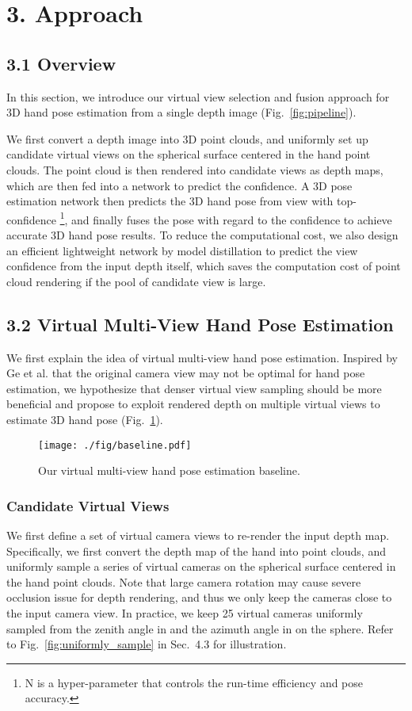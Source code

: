 \documentclass[letterpaper]{article} \usepackage{aaai22}  \usepackage{times}  \usepackage{helvet}  \usepackage{courier}  \usepackage[hyphens]{url}  \usepackage{graphicx} \urlstyle{rm} \def\UrlFont{\rm}  \usepackage{natbib}  \usepackage{caption} \DeclareCaptionStyle{ruled}{labelfont=normalfont,labelsep=colon,strut=off} \frenchspacing  \setlength{\pdfpagewidth}{8.5in}  \setlength{\pdfpageheight}{11in}  \usepackage{algorithm}
\begin{document}
\section{3. Approach}

\subsection{3.1 Overview}
In this section, we introduce our virtual view selection and fusion approach for 3D hand pose estimation from a single depth image (Fig.~\ref{fig:pipeline}). 

We first convert a depth image into 3D point clouds, and uniformly set up candidate virtual views on the spherical surface centered in the hand point clouds.
The point cloud is then rendered into candidate views as depth maps, which are then fed into a network to predict the confidence.
A 3D pose estimation network then predicts the 3D hand pose from view with top- confidence \footnote{N is a hyper-parameter that controls the run-time efficiency and pose accuracy.}, and finally fuses the pose with regard to the confidence to achieve accurate 3D hand pose results. 
To reduce the computational cost, we also design an efficient lightweight network by model distillation to predict the view confidence from the input depth itself, which saves the computation cost of point cloud rendering if the pool of candidate view is large.

\subsection{3.2 Virtual Multi-View Hand Pose Estimation}
We first explain the idea of virtual multi-view hand pose estimation.
Inspired by Ge et al. \cite{ge2016robust} that the original camera view may not be optimal for hand pose estimation, we hypothesize that denser virtual view sampling should be more beneficial and propose to exploit rendered depth on multiple virtual views to estimate 3D hand pose (Fig.~\ref{fig:baseline}).

\begin{figure}[h]
\centering 
\texttt{[image: ./fig/baseline.pdf]}
\caption{Our virtual multi-view hand pose estimation baseline.}
\label{fig:baseline}
\end{figure}

\subsubsection{Candidate Virtual Views}
We first define a set of virtual camera views to re-render the input depth map.
Specifically, we first convert the depth map of the hand into point clouds, and uniformly sample a series of virtual cameras on the spherical surface centered in the hand point clouds.
Note that large camera rotation may cause severe  occlusion issue for depth rendering, and thus we only keep the cameras close to the input camera view.
In practice, we keep 25 virtual cameras uniformly sampled from 
the zenith angle in  and the azimuth angle in  on the sphere.  Refer to Fig.~\ref{fig:uniformly_sample} in Sec.~4.3 for illustration.
\end{document}
